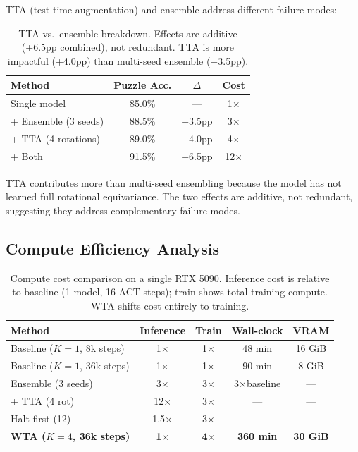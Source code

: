 TTA (test-time augmentation) and ensemble address different failure modes:
%
\begin{table}[h]
\centering
\begin{tabular}{lccc}
\toprule
Method & Puzzle Acc. & $\Delta$ & Cost \\
\midrule
Single model & 85.0\% & --- & 1$\times$ \\  %
+ Ensemble (3 seeds) & 88.5\% & +3.5pp & 3$\times$ \\  %
+ TTA (4 rotations) & 89.0\% & +4.0pp & 4$\times$ \\  %
+ Both & 91.5\% & +6.5pp & 12$\times$ \\  %
\bottomrule
\end{tabular}
\caption{TTA vs.\ ensemble breakdown. Effects are additive (+6.5pp combined),
not redundant. TTA is more impactful (+4.0pp) than multi-seed ensemble
(+3.5pp).}
\label{tab:tta-breakdown}
\end{table}
%
TTA contributes more than multi-seed ensembling because the model has not
learned full rotational equivariance. The two effects are additive, not
redundant, suggesting they address complementary failure modes.

\subsection{Compute Efficiency Analysis}

\begin{table}[htb]
\centering
\begin{tabular}{lcccc}
\toprule
Method & Inference & Train & Wall-clock & VRAM \\
\midrule
Baseline ($K{=}1$, 8k steps) & 1$\times$ & 1$\times$ & 48 min & 16 GiB \\
Baseline ($K{=}1$, 36k steps) & 1$\times$ & 1$\times$ & 90 min & 8 GiB \\
Ensemble (3 seeds) & 3$\times$ & 3$\times$ & 3$\times$baseline & --- \\
+ TTA (4 rot) & 12$\times$ & 3$\times$ & --- & --- \\
Halt-first (12) & 1.5$\times$ & 3$\times$ & --- & --- \\
\textbf{WTA ($K{=}4$, 36k steps)} & \textbf{1$\times$} & \textbf{4$\times$} & \textbf{360 min} & \textbf{30 GiB} \\
\bottomrule
\end{tabular}
\caption{Compute cost comparison on a single RTX 5090. Inference cost is
relative to baseline (1 model, 16 ACT steps); train shows total training
compute. WTA shifts cost entirely to training.}
\label{tab:compute}
\end{table}

